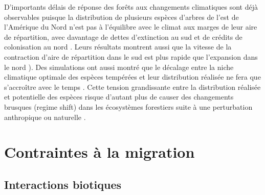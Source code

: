 D'importants délais de réponse des forêts aux changements climatiques
sont déjà observables puisque la distribution de plusieurs espèces
d'arbres de l'est de l'Amérique du Nord n'est pas à l'équilibre avec le
climat aux marges de leur aire de répartition, avec davantage de dettes
d'extinction au sud et de crédits de colonisation au nord
\citep{talluto_extinction_2017}. Leurs résultats montrent aussi que la
vitesse de la contraction d'aire de répartition dans le sud est plus
rapide que l'expansion dans le nord \citep{talluto_extinction_2017}).
Des simulations ont aussi montré que le décalage entre la niche
climatique optimale des espèces tempérées et leur distribution réalisée
ne fera que s'accroître avec le temps
\citep{vissault_biogeographie_2016}. Cette tension grandissante entre la
distribution réalisée et potentielle des espèces risque d'autant plus de
causer des changements brusques (regime shift) dans les écosystèmes
forestiers suite à une perturbation anthropique ou naturelle
\citep{vanderwel_how_2014, renwick_temporal_2015}.

\hypertarget{contraintes-uxe0-la-migration}{%
\section{Contraintes à la
migration}\label{contraintes-uxe0-la-migration}}

\hypertarget{interactions-biotiques}{%
\subsection{Interactions biotiques}\label{interactions-biotiques}}

